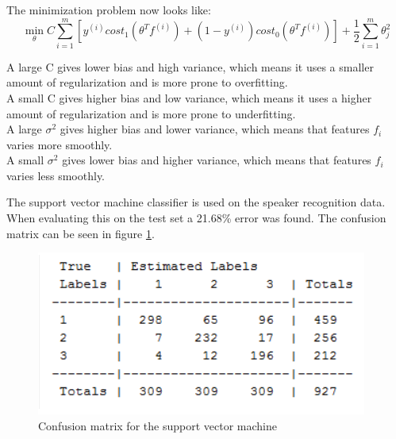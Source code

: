The minimization problem now looks like:
\begin{equation}
\min_{\theta}C \sum_{i=1}^{m}
\left[ y^{(i)}cost_1(\theta^Tf^{(i)})+(1-y^{(i)})cost_0(\theta^Tf^{(i)}) \right]
+ \frac{1}{2}\sum_{i=1}^{m}\theta^2_j
\end{equation}

A large C gives lower bias and high variance, which means it uses a smaller amount of regularization and is more prone to overfitting. \\
A small C gives higher bias and low variance, which means it uses a higher amount of regularization and is more prone to underfitting. \\
A large $\sigma^2$ gives higher bias and lower variance, which means that features $f_i$ varies more smoothly. \\
A small $\sigma^2$ gives lower bias and higher variance, which means that features $f_i$ varies less smoothly.

The support vector machine classifier is used on the speaker recognition data. When evaluating this on the test set a 21.68\% error was found. The confusion matrix can be seen in figure \ref{fig:conmatsvm}. 

\begin{figure}[H]
\centering
\includegraphics[scale=.75]{billeder/conmatsvm}
\caption{Confusion matrix for the support vector machine }
\label{fig:conmatsvm}
\end{figure}



